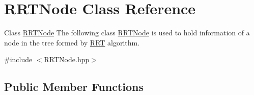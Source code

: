 \hypertarget{classRRTNode}{}\section{R\+R\+T\+Node Class Reference}
\label{classRRTNode}


Class \hyperlink{classRRTNode}{R\+R\+T\+Node} The following class \hyperlink{classRRTNode}{R\+R\+T\+Node} is used to hold information of a node in the tree formed by \hyperlink{classRRT}{R\+RT} algorithm.  




{\ttfamily \#include $<$R\+R\+T\+Node.\+hpp$>$}

\subsection*{Public Member Functions}
